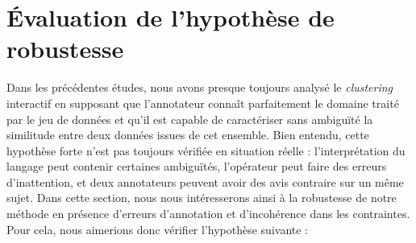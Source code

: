 \section{Évaluation de l'hypothèse de robustesse}
\label{section:4.6-HYPOTHESE-ROBUSTESSE}


	Dans les précédentes études, nous avons presque toujours analysé le \textit{clustering} interactif en supposant que l'annotateur connaît parfaitement le domaine traité par le jeu de données et qu'il est capable de caractériser sans ambiguïté la similitude entre deux données issues de cet ensemble.
	Bien entendu, cette hypothèse forte n'est pas toujours vérifiée en situation réelle : l'interprétation du langage peut contenir certaines ambiguïtés, l'opérateur peut faire des erreurs d’inattention, et deux annotateurs peuvent avoir des avis contraire sur un même sujet.
	Dans cette section, nous nous intéresserons ainsi à la robustesse de notre méthode en présence d'erreurs d’annotation et d'incohérence dans les contraintes.
	Pour cela, nous aimerions donc vérifier l'hypothèse suivante :
	
